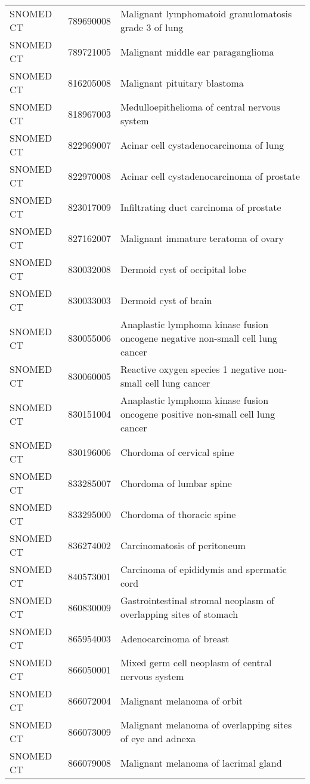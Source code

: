 \begin{longtable}{p{}p{}p{}}
  SNOMED CT & 789690008 & Malignant lymphomatoid granulomatosis grade 3 of lung \\ 
  SNOMED CT & 789721005 & Malignant middle ear paraganglioma \\ 
  SNOMED CT & 816205008 & Malignant pituitary blastoma \\ 
  SNOMED CT & 818967003 & Medulloepithelioma of central nervous system \\ 
  SNOMED CT & 822969007 & Acinar cell cystadenocarcinoma of lung \\ 
  SNOMED CT & 822970008 & Acinar cell cystadenocarcinoma of prostate \\ 
  SNOMED CT & 823017009 & Infiltrating duct carcinoma of prostate \\ 
  SNOMED CT & 827162007 & Malignant immature teratoma of ovary \\ 
  SNOMED CT & 830032008 & Dermoid cyst of occipital lobe \\ 
  SNOMED CT & 830033003 & Dermoid cyst of brain \\ 
  SNOMED CT & 830055006 & Anaplastic lymphoma kinase fusion oncogene negative non-small cell lung cancer \\ 
  SNOMED CT & 830060005 & Reactive oxygen species 1 negative non-small cell lung cancer \\ 
  SNOMED CT & 830151004 & Anaplastic lymphoma kinase fusion oncogene positive non-small cell lung cancer \\ 
  SNOMED CT & 830196006 & Chordoma of cervical spine \\ 
  SNOMED CT & 833285007 & Chordoma of lumbar spine \\ 
  SNOMED CT & 833295000 & Chordoma of thoracic spine \\ 
  SNOMED CT & 836274002 & Carcinomatosis of peritoneum \\ 
  SNOMED CT & 840573001 & Carcinoma of epididymis and spermatic cord \\ 
  SNOMED CT & 860830009 & Gastrointestinal stromal neoplasm of overlapping sites of stomach \\ 
  SNOMED CT & 865954003 & Adenocarcinoma of breast \\ 
  SNOMED CT & 866050001 & Mixed germ cell neoplasm of central nervous system \\ 
  SNOMED CT & 866072004 & Malignant melanoma of orbit \\ 
  SNOMED CT & 866073009 & Malignant melanoma of overlapping sites of eye and adnexa \\ 
  SNOMED CT & 866079008 & Malignant melanoma of lacrimal gland \\ 

\end{longtable}
